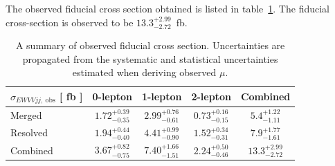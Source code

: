 The observed fiducial cross section obtained is listed in table~\ref{tab:obsxsec}.
The fiducial cross-section is observed to be $13.3^{+2.99}_{-2.72}$~fb.
\begin{table}[H]
\begin{center}
\begin{tabular}{|l|c|c|c||c|}
\hline$\sigma_{EWVVjj,~\mathrm{obs}}$ [ fb ]& 0-lepton          & 1-lepton          & 2-lepton    & Combined \\ \hline 
Merged                                      & $1.72^{+0.39}_{-0.35}$ & $2.99^{+0.76}_{-0.61}$ & $0.73^{+0.16}_{-0.15}$ &$ 5.4^{+1.22}_{-1.11}$  \\ \hline 
Resolved                                    & $1.94^{+0.44}_{-0.40}$ & $4.41^{+0.99}_{-0.90}$ & $1.52^{+0.34}_{-0.31}$ &$ 7.9^{+1.77}_{-1.61}$  \\ \hline
Combined                                    & $3.67^{+0.82}_{-0.75}$ & $7.40^{+1.66}_{-1.51}$ & $2.24^{+0.50}_{-0.46}$ &$ 13.3^{+2.99}_{-2.72}$ \\ \hline      
\end{tabular}
\caption{\label{tab:obsxsec} A summary of observed fiducial cross section. Uncertainties are propagated from the systematic and statistical uncertainties estimated when deriving observed $\mu$. }
\end{center}
\end{table}


